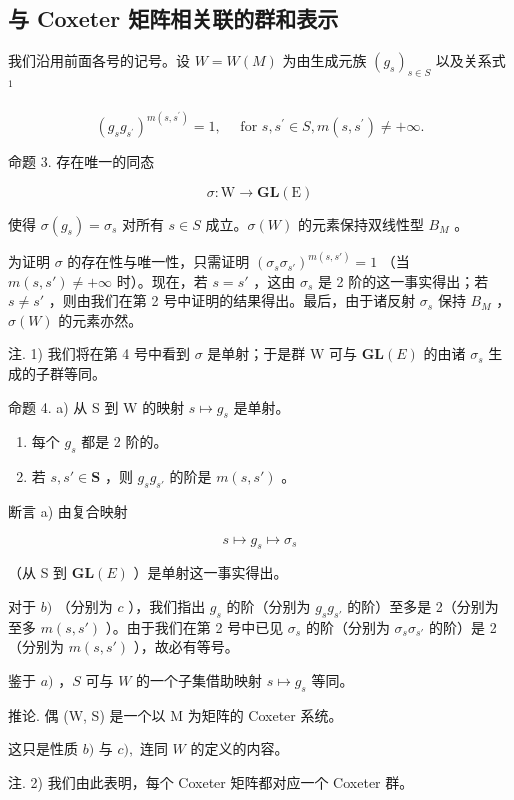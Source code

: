 \subsection{与 Coxeter 矩阵相关联的群和表示}

我们沿用前面各号的记号。设 \(W = W(M)\) 为由生成元族 \((g_{s})_{s \in S}\) 以及关系式 \(^{1}\)

\[
\left(g _ {s} g _ {s ^ {\prime}}\right) ^ {m \left(s, s ^ {\prime}\right)} = 1, \quad \text { for } s, s ^ {\prime} \in S, m \left(s, s ^ {\prime}\right) \neq + \infty .
\]

命题 3. 存在唯一的同态

\[
\sigma : \mathrm{W} \rightarrow \mathbf {G L} (\mathrm{E})
\]

使得 \(\sigma(g_s) = \sigma_s\) 对所有 \(s \in S\) 成立。\(\sigma(W)\) 的元素保持双线性型 \(B_M\) 。

为证明 \(\sigma\) 的存在性与唯一性，只需证明 \((\sigma_s \sigma_{s'})^{m(s, s')} = 1\) （当 \(m(s, s') \neq +\infty\) 时）。现在，若 \(s = s'\) ，这由 \(\sigma_s\) 是 2 阶的这一事实得出；若 \(s \neq s'\) ，则由我们在第 2 号中证明的结果得出。最后，由于诸反射 \(\sigma_s\) 保持 \(B_M\) ，\(\sigma(W)\) 的元素亦然。

注. 1) 我们将在第 4 号中看到 \(\sigma\) 是单射；于是群 W 可与 \(\mathbf{GL}(E)\) 的由诸 \(\sigma_s\) 生成的子群等同。

命题 4. a) 从 S 到 W 的映射 \(s \mapsto g_s\) 是单射。

\begin{enumerate}
\def\labelenumi{\alph{enumi})}
\setcounter{enumi}{1}
\item
  每个 \(g_{s}\) 都是 2 阶的。
\item
  若 \(s, s' \in \mathbf{S}\) ，则 \(g_s g_{s'}\) 的阶是 \(m(s, s')\) 。
\end{enumerate}

断言 a) 由复合映射

\[
s \mapsto g _ {s} \mapsto \sigma_ {s}
\]

（从 S 到 \(\mathbf{GL}(E)\) ）是单射这一事实得出。

对于 \(b)\) （分别为 \(c\) ），我们指出 \(g_{s}\) 的阶（分别为 \(g_{s}g_{s'}\) 的阶）至多是 2（分别为至多 \(m(s, s')\) ）。由于我们在第 2 号中已见 \(\sigma_{s}\) 的阶（分别为 \(\sigma_{s}\sigma_{s'}\) 的阶）是 2（分别为 \(m(s, s')\) ），故必有等号。

鉴于 \(a)\) ，\(S\) 可与 \(W\) 的一个子集借助映射 \(s \mapsto g_s\) 等同。

推论. 偶 (W, S) 是一个以 M 为矩阵的 Coxeter 系统。

这只是性质 \(b)\) 与 \(c),\) 连同 \(W\) 的定义的内容。

注. 2) 我们由此表明，每个 Coxeter 矩阵都对应一个 Coxeter 群。

